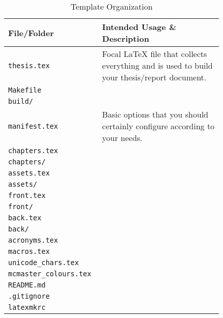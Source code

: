 \begin{longtable}[c]{|>{\raggedright}p{0.3\linewidth}|>{\raggedright\arraybackslash}p{0.54\linewidth}|}
    \caption{Template Organization}
    \label{tab:organization}                                              \\

    \hline

    \rowcolor{McMasterMediumGrey}
    \textbf{File/Folder}     & \textbf{Intended Usage \& Description}
    \\ \hline

    \texttt{thesis.tex} & Focal \LaTeX{} file that collects everything and is
    used to build your thesis/report document.
    \\ \hline

    \texttt{Makefile} & 
    \\ \hline

    \texttt{build/} & 
    \\ \hline

    \texttt{manifest.tex} & Basic options that you should certainly configure
    according to your needs.
    \\ \hline

    \texttt{chapters.tex} & 
    \\ \hline

    \texttt{chapters/} & 
    \\ \hline

    \texttt{assets.tex} & 
    \\ \hline

    \texttt{assets/} & 
    \\ \hline

    \texttt{front.tex} & 
    \\ \hline

    \texttt{front/} & 
    \\ \hline

    \texttt{back.tex} & 
    \\ \hline

    \texttt{back/} & 
    \\ \hline

    \texttt{acronyms.tex} & 
    \\ \hline

    \texttt{macros.tex} & 
    \\ \hline

    \texttt{unicode\_chars.tex} & 
    \\ \hline

    \texttt{mcmaster\_colours.tex} & 
    \\ \hline

    \texttt{README.md} &
    \\ \hline

    \texttt{.gitignore} & 
    \\ \hline

    \texttt{latexmkrc} & 
    \\ \hline
\end{longtable}
